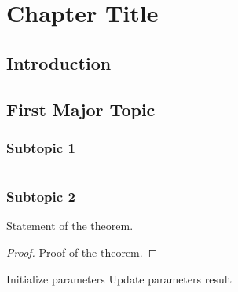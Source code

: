 
\chapter{Chapter Title}

\begin{abstract}
This is a brief overview of the chapter, highlighting the main topics covered and their significance in the field of optimization for machine learning.
\end{abstract}

\section{Introduction}

\section{First Major Topic}
\subsection{Subtopic 1}
\begin{equation}
\end{equation}

\subsection{Subtopic 2}

\begin{theorem}
Statement of the theorem.
\end{theorem}

\begin{proof}
Proof of the theorem.
\end{proof}

\begin{algorithm}
\caption{Algorithm Name}
\begin{algorithmic}
\STATE Initialize parameters
\STATE Update parameters
\ENDWHILE
\RETURN result
\end{algorithmic}
\end{algorithm}

